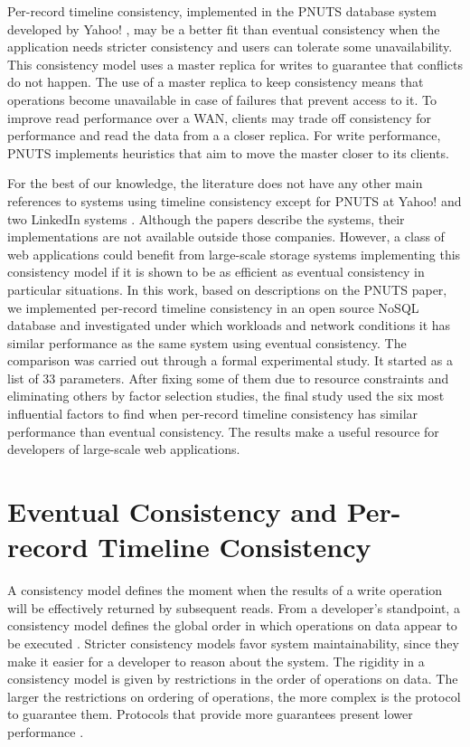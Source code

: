 \documentclass[man,floatsintext,12pt]{apa6}
\begin{document}
Per-record timeline consistency, implemented in the PNUTS database system
developed by Yahoo! \parencite{Cooper2008}, may be a better fit than eventual
consistency when the application needs stricter consistency and users can
tolerate some unavailability. This consistency model uses a master replica for
writes to guarantee that conflicts do not happen. The use of a master replica
to keep consistency means that operations become unavailable in case of
failures that prevent access to it. To improve read performance over a WAN,
clients may trade off consistency for performance and read the data from a a
closer replica. For write performance, PNUTS implements heuristics that aim to
move the master closer to its clients.

For the best of our knowledge, the literature does not have any other main
references to systems using timeline consistency except for PNUTS at Yahoo!
\parencite{Cooper2008,Kadambi2011,Ramakrishnan2012,Silberstein2012} and two
LinkedIn systems \parencite{Rao2011,Qiao2013}. Although the papers describe the
systems, their implementations are not available outside those companies.
However, a class of web applications could benefit from large-scale storage
systems implementing this consistency model if it is shown to be as efficient
as eventual consistency in particular situations. In this work, based on
descriptions on the PNUTS paper, we implemented per-record timeline consistency
in an open source NoSQL database and investigated under which workloads and
network conditions it has similar performance as the same system using eventual
consistency. The comparison was carried out through a formal experimental
study. It started as a list of 33 parameters. After fixing some of them due to
resource constraints and eliminating others by factor selection studies, the
final study used the six most influential factors to find when per-record
timeline consistency has similar performance than eventual consistency. The
results make a useful resource for developers of large-scale web applications.

\section{Eventual Consistency and Per-record Timeline Consistency}

A consistency model defines the moment when the results of a write operation
will be effectively returned by subsequent reads. From a developer's
standpoint, a consistency model defines the global order in which operations on
data appear to be executed \parencite{Adve1995}. Stricter consistency models
favor system maintainability, since they make it easier for a developer to
reason about the system. The rigidity in a consistency model is given by
restrictions in the order of operations on data. The larger the restrictions on
ordering of operations, the more complex is the protocol to guarantee them.
Protocols that provide more guarantees present lower performance
\parencite{Mosberger1993}.
\end{document}
